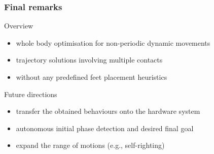 \documentclass[11pt]{beamer}
\begin{document}
\begin{frame}\frametitle{\color{black} Final remarks}
  \begin{block}{Overview}
    \begin{itemize}\addtolength{\itemsep}{0.1ex}
      \item whole body optimisation for non-periodic dynamic movements
      \item trajectory solutions involving multiple contacts
      \item without any predefined feet placement heuristics
    \end{itemize} 
  \end{block}
  
    \begin{block}{Future directions}
     \begin{itemize}\addtolength{\itemsep}{0.1ex}
      \item transfer the obtained behaviours onto the hardware system
      \item autonomous initial phase detection and desired final goal 
      \item expand the range of motions (e.g., self-righting)
     \end{itemize}
    \end{block}

\end{frame}
\end{document}
